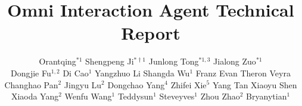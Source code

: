 





\title{Omni Interaction Agent Technical Report}




\makeatletter
\def\AB@authnote#1{}
\def\AB@affilnote#1{}
\renewcommand\AB@affilsepx{\protect\\ \protect\Affilfont}
\makeatother







\author{
Orantqing$^{*1}$ \quad Shengpeng Ji$^{*\dagger1}$ \quad Junlong Tong$^{*1,3}$ \quad Jialong Zuo$^{*1}$ \\ Dongjie Fu$^{1,2}$ \quad Di Cao$^1$ \quad Yangzhuo Li \quad Shangda Wu$^1$ \quad Franz \quad Evan \quad Theron Veyra \quad Changhao Pan$^2$ \quad Jingyu Lu$^2$ \quad Dongchao Yang$^4$ \quad Zhifei Xie$^5$ \quad Yang Tan \quad Xiaoyu Shen  \quad Xiaoda Yang$^2$ \quad Wenfu Wang$^1$ \quad Teddysun$^1$ \quad Steveyves$^1$ \quad Zhou Zhao$^2$ \quad Bryanytian$^1$ 
}







\newcommand{\fix}{\marginpar{FIX}}
\newcommand{\new}{\marginpar{NEW}}



\maketitle

\vspace{-1em}



